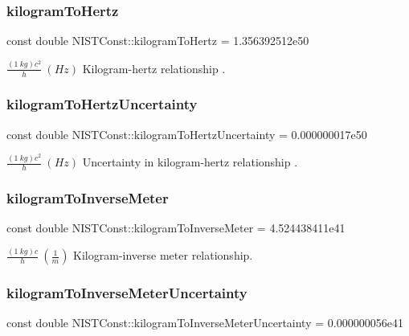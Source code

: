 \subsubsection{\texorpdfstring{kilogram\+To\+Hertz}{kilogramToHertz}}
{\footnotesize\ttfamily const double N\+I\+S\+T\+Const\+::kilogram\+To\+Hertz = 1.\+356392512e50}

$\frac{(1\ kg)c^2}{h} \ (Hz)$ Kilogram-\/hertz relationship . \mbox{\label{group___kilogram_ga692cf4dd08ad49aee0b148a1353c1776}} 
\subsubsection{\texorpdfstring{kilogram\+To\+Hertz\+Uncertainty}{kilogramToHertzUncertainty}}
{\footnotesize\ttfamily const double N\+I\+S\+T\+Const\+::kilogram\+To\+Hertz\+Uncertainty = 0.\+000000017e50}

$\frac{(1\ kg)c^2}{h} \ (Hz)$ Uncertainty in kilogram-\/hertz relationship . \mbox{\label{group___kilogram_gaeb262618c1568d210f8a5a8fdca39ae2}} 
\subsubsection{\texorpdfstring{kilogram\+To\+Inverse\+Meter}{kilogramToInverseMeter}}
{\footnotesize\ttfamily const double N\+I\+S\+T\+Const\+::kilogram\+To\+Inverse\+Meter = 4.\+524438411e41}

$\frac{(1\ kg)c}{h} \ (\frac{1}{m})$ Kilogram-\/inverse meter relationship. \mbox{\label{group___kilogram_ga645bb9b0850ae8c2ac2fbf8d480bc013}} 
\subsubsection{\texorpdfstring{kilogram\+To\+Inverse\+Meter\+Uncertainty}{kilogramToInverseMeterUncertainty}}
{\footnotesize\ttfamily const double N\+I\+S\+T\+Const\+::kilogram\+To\+Inverse\+Meter\+Uncertainty = 0.\+000000056e41}

